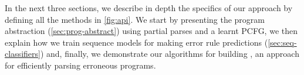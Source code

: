 In the next three sections, we describe in depth the specifics of our approach
by defining all the methods in \autoref{fig:api}. We start by presenting the
program abstraction (\autoref{sec:prog-abstract}) using partial parses and a
learnt PCFG, we then explain how we train sequence models for making error rule
predictions (\autoref{sec:seq-classifiers}) and, finally, we demonstrate our
algorithms for building \toolname, an approach for efficiently parsing erroneous
programs.
